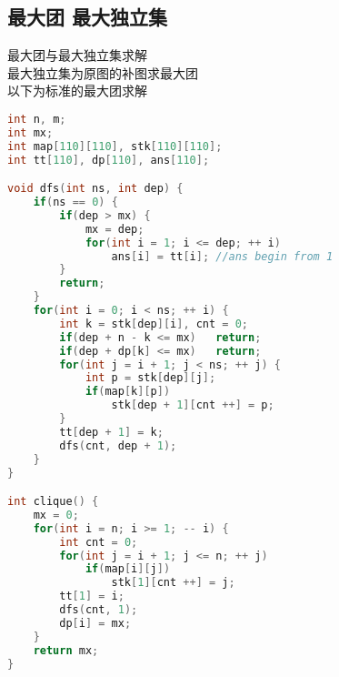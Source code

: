 \subsection{最大团 最大独立集}
最大团与最大独立集求解\\
最大独立集为原图的补图求最大团\\
以下为标准的最大团求解
    \begin{lstlisting}[language=c++]
int n, m;
int mx;
int map[110][110], stk[110][110];
int tt[110], dp[110], ans[110];

void dfs(int ns, int dep) {
    if(ns == 0) {
        if(dep > mx) {
            mx = dep;
            for(int i = 1; i <= dep; ++ i)
                ans[i] = tt[i]; //ans begin from 1
        }
        return;
    }
    for(int i = 0; i < ns; ++ i) {
        int k = stk[dep][i], cnt = 0;
        if(dep + n - k <= mx)   return;
        if(dep + dp[k] <= mx)   return;
        for(int j = i + 1; j < ns; ++ j) {
            int p = stk[dep][j];
            if(map[k][p])
                stk[dep + 1][cnt ++] = p;
        }
        tt[dep + 1] = k;
        dfs(cnt, dep + 1);
    }
}

int clique() {
    mx = 0;
    for(int i = n; i >= 1; -- i) {
        int cnt = 0;
        for(int j = i + 1; j <= n; ++ j)
            if(map[i][j])
                stk[1][cnt ++] = j;
        tt[1] = i;
        dfs(cnt, 1);
        dp[i] = mx;
    }
    return mx;
}
    \end{lstlisting}
